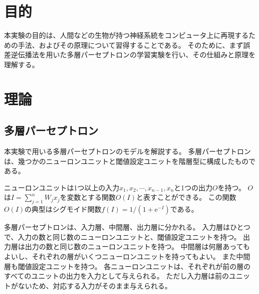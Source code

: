 \documentclass[final]{jarticle}[2012/05/15]
\begin{document}
\section{目的}
本実験の目的は、人間などの生物が持つ神経系統をコンピュータ上に再現するための手法、およびその原理について習得することである。
そのために、まず誤差逆伝播法を用いた多層パーセプトロンの学習実験を行い、その仕組みと原理を理解する。
\par
\section{理論}
\subsection{多層パーセプトロン}
本実験で用いる多層パーセプトロンのモデルを解説する。
多層パーセプトロンは、幾つかのニューロンユニットと閾値設定ユニットを階層型に構成したものである。
\par
ニューロンユニットは1つ以上の入力$x_{1},x_{2},\cdots,x_{n-1},x_{n}$と1つの出力$O$を持つ。
$O$は$I=\sum_{j=1}^{n}W_{j}x_{j}$を変数とする関数$O(I)$と表すことができる。
この関数$O(I)$の典型はシグモイド関数$f(I)=1/(1+\mathrm{e}^{-I})$である。
\par
多層パーセプトロンは、入力層、中間層、出力層に分かれる。
入力層はひとつで、入力の数と同じ数のニューロンユニットと、閾値設定ユニットを持つ。
出力層は出力の数と同じ数のニューロンユニットを持つ。
中間層は何層あってもよいし、それぞれの層がいくつニューロンユニットを持ってもよい。
また中間層も閾値設定ユニットを持つ。
各ニューロンユニットは、それぞれが前の層のすべてのユニットの出力を入力として与えられる。
ただし入力層は前のユニットがないため、対応する入力がそのまま与えられる。
\par
\end{document}
